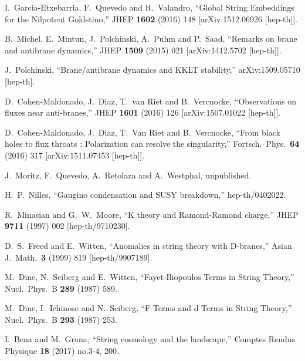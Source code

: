 \documentclass[11pt,a4paper]{article}
\begin{document}
\begin{itemize}
\begin{thebibliography}{99}
  I.~Garcia-Etxebarria, F.~Quevedo and R.~Valandro,
  ``Global String Embeddings for the Nilpotent Goldstino,''
  JHEP {\bf 1602} (2016) 148
  [arXiv:1512.06926 [hep-th]].

  B.~Michel, E.~Mintun, J.~Polchinski, A.~Puhm and P.~Saad,
  ``Remarks on brane and antibrane dynamics,''
  JHEP {\bf 1509} (2015) 021
  [arXiv:1412.5702 [hep-th]].

  J.~Polchinski,
  ``Brane/antibrane dynamics and KKLT stability,''
  arXiv:1509.05710 [hep-th].

  D.~Cohen-Maldonado, J.~Diaz, T.~van Riet and B.~Vercnocke,
  ``Observations on fluxes near anti-branes,''
  JHEP {\bf 1601} (2016) 126
  [arXiv:1507.01022 [hep-th]].

  D.~Cohen-Maldonado, J.~Diaz, T.~Van Riet and B.~Vercnocke,
  ``From black holes to flux throats : Polarization can resolve the singularity,''
  Fortsch.\ Phys.\  {\bf 64} (2016) 317
  [arXiv:1511.07453 [hep-th]].

J.~Moritz, F.~Quevedo, A.~Retolaza and A.~Westphal, unpublished.

  H.~P.~Nilles,
  ``Gaugino condensation and SUSY breakdown,''
  hep-th/0402022.

  R.~Minasian and G.~W.~Moore,
  ``K theory and Ramond-Ramond charge,''
  JHEP {\bf 9711} (1997) 002
  [hep-th/9710230].

  D.~S.~Freed and E.~Witten,
  ``Anomalies in string theory with D-branes,''
  Asian J.\ Math.\  {\bf 3} (1999) 819
  [hep-th/9907189].

  M.~Dine, N.~Seiberg and E.~Witten,
  ``Fayet-Iliopoulos Terms in String Theory,''
  Nucl.\ Phys.\ B {\bf 289} (1987) 589.

  M.~Dine, I.~Ichinose and N.~Seiberg,
  ``F Terms and d Terms in String Theory,''
  Nucl.\ Phys.\ B {\bf 293} (1987) 253.

  I.~Bena and M.~Grana,
  ``String cosmology and the landscape,''
  Comptes Rendus Physique {\bf 18} (2017) no.3-4,  200.


\end{thebibliography}
\end{itemize}
\end{document}
